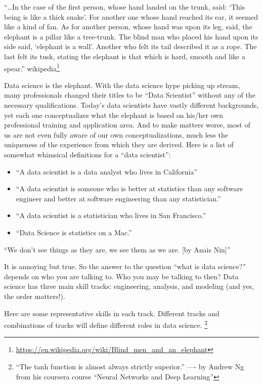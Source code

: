 \documentclass[12pt,]{krantz}
\providecommand{\tightlist}{%
  \setlength{\itemsep}{0pt}\setlength{\parskip}{0pt}}
\renewenvironment{quote}{\begin{VF}}{\end{VF}}
\renewcommand{\href}[2]{#2\footnote{\url{#1}}}
\begin{document}
\begin{quote}
``\ldots{}In the case of the first person, whose hand landed on the trunk, said: `This being is like a thick snake'. For another one whose hand reached its ear, it seemed like a kind of fan. As for another person, whose hand was upon its leg, said, the elephant is a pillar like a tree-trunk. The blind man who placed his hand upon its side said, `elephant is a wall'. Another who felt its tail described it as a rope. The last felt its tusk, stating the elephant is that which is hard, smooth and like a spear.'' \href{https://en.wikipedia.org/wiki/Blind_men_and_an_elephant}{wikipedia}
\end{quote}

Data science is the elephant. With the data science hype picking up stream, many professionals changed their titles to be ``Data Scientist'' without any of the necessary qualifications. Today's data scientists have vastly different backgrounds, yet each one conceptualizes what the elephant is based on his/her own professional training and application area. And to make matters worse, most of us are not even fully aware of our own conceptualizations, much less the uniqueness of the experience from which they are derived. Here is a list of somewhat whimsical definitions for a ``data scientist'':

\begin{itemize}
\tightlist
\item
  ``A data scientist is a data analyst who lives in California''
\item
  ``A data scientist is someone who is better at statistics than any software engineer and better at software engineering than any statistician.''
\item
  ``A data scientist is a statistician who lives in San Francisco.''
\item
  ``Data Science is statistics on a Mac.''
\end{itemize}

\begin{quote}
``We don't see things as they are, we see them as we are. {[}by Anais Nin{]}''
\end{quote}

It is annoying but true. So the answer to the question ``what is data science?'' depends on who you are talking to. Who you may be talking to then? Data science has three main skill tracks: engineering, analysis, and modeling (and yes, the order matters!).

Here are some representative skills in each track. Different tracks and combinations of tracks will define different roles in data science. \footnote{``The tanh function is almost always strictly superior.'' ---- by Andrew Ng from his coursera course ``Neural Networks and Deep Learning''}
\end{document}
